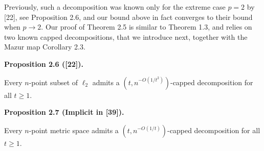 \documentclass[10pt,a4paper]{amsart}
\begin{document}
\par
\par
Previously, such a decomposition was known only for the extreme case $p=2$ by [22], see Proposition 2.6, and our bound above in fact converges to their bound when $p\to 2$. Our proof of Theorem 2.5 is similar to Theorem 1.3, and relies on two known capped decompositions, that we introduce next, together with the Mazur map Corollary 2.3.
\par
\par
\par\medskip\noindent\textbf{Proposition 2.6 ([22]).}\par
Every $n$-point subset of $\ell_{2}$ admits a $(t,n^{-O(1/t^{2})})$-capped decomposition for all $t\geq 1$.
\par
\par
\par
\par\medskip\noindent\textbf{Proposition 2.7 (Implicit in [39]).}\par
Every $n$-point metric space admits a $(t,n^{-O(1/t)})$-capped decomposition for all $t\geq 1$.
\par
\par
\par
\end{document}
